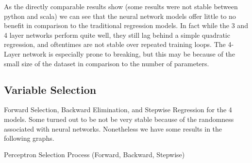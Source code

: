 \documentclass{article}
\begin{document}
	As the directly comparable results show (some results were not stable between python and scala) we can see that the neural 
	network models offer little to no benefit in comparison to the traditional regression models. In fact 
	while the 3 and 4 layer networks perform quite well, they still lag behind a simple quadratic regression, and 
	oftentimes are not stable over repeated training loops. The 4-Layer network is especially prone to breaking, but 
	this may be because of the small size of the dataset in comparison to the number of parameters. 
	
	\subsection{Variable Selection}
	
	Forward Selection, Backward Elimination, and Stepwise Regression for the 4 models. Some turned out to be 
	not be very stable because of the randomness associated with neural networks. Nonetheless we have some results in the following graphs. 
	
	Perceptron Selection Process (Forward, Backward, Stepwise)
	
\end{document}
